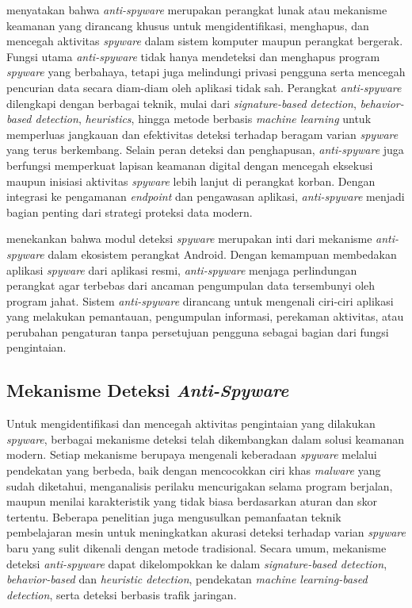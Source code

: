 \textcite{baldota2025review} menyatakan bahwa \textit{anti-spyware} merupakan 
perangkat lunak atau mekanisme keamanan yang dirancang khusus untuk 
mengidentifikasi, menghapus, dan mencegah aktivitas \textit{spyware} 
dalam sistem komputer maupun perangkat bergerak. Fungsi utama 
\textit{anti-spyware} tidak hanya mendeteksi dan menghapus program 
\textit{spyware} yang berbahaya, tetapi juga melindungi privasi pengguna 
serta mencegah pencurian data secara diam-diam oleh aplikasi tidak sah. 
Perangkat \textit{anti-spyware} dilengkapi dengan berbagai teknik, mulai 
dari \textit{signature-based detection}, \textit{behavior-based detection}, 
\textit{heuristics}, hingga metode berbasis \textit{machine learning} 
untuk memperluas jangkauan dan efektivitas deteksi terhadap beragam varian 
\textit{spyware} yang terus berkembang. Selain peran deteksi dan penghapusan, 
\textit{anti-spyware} juga berfungsi memperkuat lapisan keamanan digital 
dengan mencegah eksekusi maupun inisiasi aktivitas \textit{spyware} lebih 
lanjut di perangkat korban. Dengan integrasi ke pengamanan \textit{endpoint} 
dan pengawasan aplikasi, \textit{anti-spyware} menjadi bagian penting dari 
strategi proteksi data modern.

\textcite{qabalin2022android} menekankan bahwa modul deteksi \textit{spyware} 
merupakan inti dari mekanisme \textit{anti-spyware} dalam ekosistem 
perangkat Android. Dengan kemampuan membedakan aplikasi \textit{spyware} 
dari aplikasi resmi, \textit{anti-spyware} menjaga perlindungan perangkat 
agar terbebas dari ancaman pengumpulan data tersembunyi oleh program jahat. 
Sistem \textit{anti-spyware} dirancang untuk mengenali ciri-ciri aplikasi 
yang melakukan pemantauan, pengumpulan informasi, perekaman aktivitas, atau 
perubahan pengaturan tanpa persetujuan pengguna sebagai bagian dari fungsi 
pengintaian.

\subsection{Mekanisme Deteksi \textit{Anti-Spyware}}
Untuk mengidentifikasi dan mencegah aktivitas pengintaian yang dilakukan 
\textit{spyware}, berbagai mekanisme deteksi telah dikembangkan dalam 
solusi keamanan modern. Setiap mekanisme berupaya mengenali keberadaan 
\textit{spyware} melalui pendekatan yang berbeda, baik dengan mencocokkan 
ciri khas \textit{malware} yang sudah diketahui, menganalisis perilaku 
mencurigakan selama program berjalan, maupun menilai karakteristik yang 
tidak biasa berdasarkan aturan dan skor tertentu. Beberapa penelitian juga 
mengusulkan pemanfaatan teknik pembelajaran mesin untuk meningkatkan akurasi 
deteksi terhadap varian \textit{spyware} baru yang sulit dikenali dengan 
metode tradisional. Secara umum, mekanisme deteksi \textit{anti-spyware} 
dapat dikelompokkan ke dalam \textit{signature-based detection}, 
\textit{behavior-based} dan \textit{heuristic detection}, pendekatan 
\textit{machine learning-based detection}, serta deteksi berbasis trafik jaringan.

